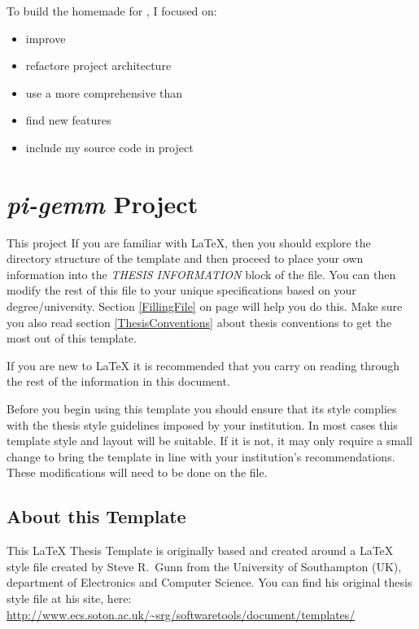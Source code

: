 To build the homemade  for \iBubble, I focused on:
\begin{itemize}
	\item improve 
	\item refactore project architecture
	\item use a more comprehensive  than 
	\item find new \vc{} features
	\item include my source code in  project
\end{itemize}


\section{\emph{pi-gemm} Project}

This project \parencite{refPiGemm}
If you are familiar with \LaTeX{}, then you should explore the directory structure of the template and then proceed to place your own information into the \emph{THESIS INFORMATION} block of the  file. You can then modify the rest of this file to your unique specifications based on your degree/university. Section \ref{FillingFile} on page \pageref{FillingFile} will help you do this. Make sure you also read section \ref{ThesisConventions} about thesis conventions to get the most out of this template.

If you are new to \LaTeX{} it is recommended that you carry on reading through the rest of the information in this document.

Before you begin using this template you should ensure that its style complies with the thesis style guidelines imposed by your institution. In most cases this template style and layout will be suitable. If it is not, it may only require a small change to bring the template in line with your institution's recommendations. These modifications will need to be done on the  file.

\subsection{About this Template}

This \LaTeX{} Thesis Template is originally based and created around a \LaTeX{} style file created by Steve R.\ Gunn from the University of Southampton (UK), department of Electronics and Computer Science. You can find his original thesis style file at his site, here:
\url{http://www.ecs.soton.ac.uk/~srg/softwaretools/document/templates/}

